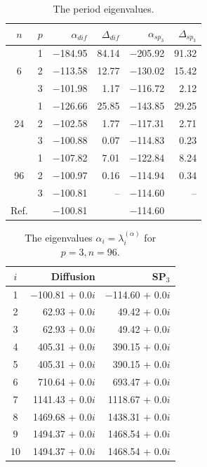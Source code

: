 \documentclass[authoryear]{elsarticle}
\begin{document}
\begin{table}[h]
\caption{The period eigenvalues.}
\label{tab:iaea_with_alpha}
\begin{center}
\begin{tabular}{c c r r r r}
\hline
$n$ & $p$ & $\alpha_{dif}$ & $\Delta_{dif}$ &$\alpha_{sp_3}$& $\Delta_{sp_3}$ \\
\hline
	& 1	& $-$184.95 & 84.14 & $-$205.92 & 91.32\\
6	& 2	& $-$113.58 & 12.77 & $-$130.02 & 15.42\\
	& 3	& $-$101.98 &  1.17 & $-$116.72 &  2.12\\ 
\hline
	& 1	& $-$126.66 & 25.85 & $-$143.85 & 29.25\\
24& 2	& $-$102.58 &  1.77 & $-$117.31 &  2.71\\
	& 3	& $-$100.88 &  0.07 & $-$114.83 &  0.23\\ 
\hline
	& 1	& $-$107.82 &  7.01 & $-$122.84 & 8.24\\
96& 2	& $-$100.97 &  0.16 & $-$114.94 & 0.34\\
	& 3	& $-$100.81 &	 -- & $-$114.60 &  -- \\ 
\hline
Ref.& & $-$100.81 & & $-$114.60 \\ 
\hline
\end{tabular}
\end{center}
\end{table}

\begin{table}[h]
\caption{The eigenvalues $\alpha_i=\lambda_i^{(\alpha)}$ for $p=3, n=96$.}
\label{tab:iaea_with_alpha_10}
\begin{center}
\begin{tabular}{c r r}
\hline
$i$ & Diffusion & SP$_3$ \\
\hline
1 &$-$100.81 + 0.0$i$&$-$114.60 + 0.0$i$ \\
2 &  62.93 + 0.0$i$& 49.42 + 0.0$i$ \\
3 &  62.93 + 0.0$i$& 49.42 + 0.0$i$ \\
4 & 405.31 + 0.0$i$&390.15 + 0.0$i$ \\
5 & 405.31 + 0.0$i$&390.15 + 0.0$i$ \\
6 & 710.64 + 0.0$i$&693.47 + 0.0$i$ \\
7 &1141.43 + 0.0$i$&1118.67 + 0.0$i$ \\
8 &1469.68 + 0.0$i$&1438.31 + 0.0$i$ \\
9 &1494.37 + 0.0$i$&1468.54 + 0.0$i$ \\
10&1494.37 + 0.0$i$&1468.54 + 0.0$i$ \\
\hline
\end{tabular}
\end{center}
\end{table}
\end{document}
